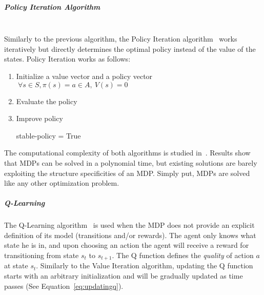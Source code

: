\subparagraph{Policy Iteration Algorithm}\textbf{\\}
Similarly to the previous algorithm, the Policy Iteration algorithm~\cite{policyiteration} works iteratively but directly determines the optimal policy instead of the value of the states.
Policy Iteration works as follows:
\begin{enumerate}
    \item Initialize a value vector and a policy vector $~\forall s\in S,\pi(s)=a\in A,~V(s)=0$
    \item Evaluate the policy
        \begin{algorithm}
        \end{algorithm}\newpage
    \item Improve policy
    \begin{algorithm}
        stable-policy = True
    \end{algorithm}
\end{enumerate}



The computational complexity of both algorithms is studied in~\cite{mdpcomplexity}.
Results show that MDPs can be solved in a polynomial time, but existing solutions are barely exploiting the structure specificities of an MDP. Simply put, MDPs are solved like any other optimization problem.

\subparagraph{Q-Learning}
The Q-Learning algorithm~\cite{qlearning} is used when the MDP does not provide an explicit definition of its model (\ie transitions and/or rewards).
The agent only knows what state he is in, and upon choosing an action the agent will receive a reward for transitioning from state $s_t$ to $s_{t+1}$.
The Q function defines the \textit{quality} of action $a$ at state $s_t$.
Similarly to the Value Iteration algorithm, updating the Q function starts with an arbitrary initialization and will be gradually updated as time passes (See Equation~\eqref{eq:updatingq}).

